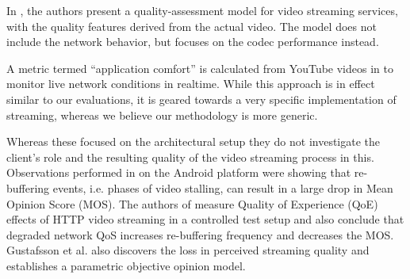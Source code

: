 
In \cite{pv2010qoe}, the authors present a quality-assessment model for video streaming services, with the quality features derived from the actual video. The model does not include the network behavior, but focuses on the codec performance instead. 

A metric termed ``application comfort'' is calculated from YouTube videos in \cite{staehle2010yomo} to monitor live network conditions in realtime. While this approach is in effect similar to our evaluations, it is geared towards a very specific implementation of streaming, whereas we believe our methodology is more generic.

Whereas these focused on the architectural setup they do not investigate the client's role and the resulting quality of the video streaming process in this. 
Observations performed in \cite{ketyko2010qoe} on the Android platform were showing that re-buffering events, i.e. phases of video stalling, can result in a large drop in Mean Opinion Score (MOS). The authors of \cite{mokmeasuring} measure Quality of Experience (QoE) effects of HTTP video streaming in a controlled test setup and also conclude that degraded network QoS increases re-buffering frequency and decreases the MOS. Gustafsson et al. \cite{gustafsson2008measuring} also discovers the loss in perceived streaming quality and establishes a parametric objective opinion model.




